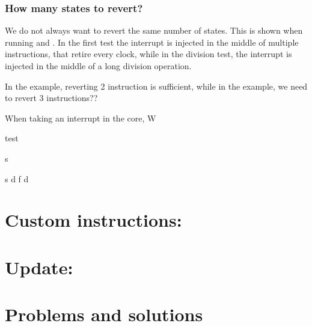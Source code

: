 \subsubsection{How many states to revert?}

We do not always want to revert the same number of states. This is shown when running  and . In the first test the interrupt is injected in the middle of multiple  instructions, that retire every clock, while in the division test, the interrupt is injected in the middle of a long division operation.

In the  example, reverting 2 instruction is sufficient, while in the  example, we need to revert 3 instructions??


When taking an interrupt in the core, W



test


s


s
d
f
d

\section{Custom instructions:}



\section{Update: }

\section{Problems and solutions}


